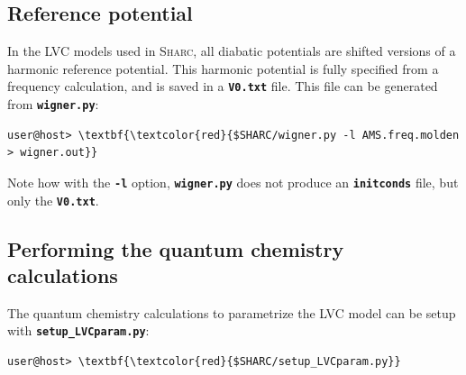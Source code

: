 \documentclass[a4paper,11pt,DIV=15,openany]{scrbook}
\newcommand{\sharc}{\textsc{Sharc}}
\newcommand{\ttt}[1]{\textbf{\texttt{#1}}}
\begin{document}
\subsection{Reference potential}

In the LVC models used in \sharc, all diabatic potentials are shifted versions of a harmonic reference potential.
This harmonic potential is fully specified from a frequency calculation, and is saved in a \ttt{V0.txt} file.
This file can be generated from \ttt{wigner.py}:
\begin{Verbatim}[commandchars=\\\{\}]
user@host> \textbf{\textcolor{red}{$SHARC/wigner.py -l AMS.freq.molden > wigner.out}}
\end{Verbatim}
Note how with the \ttt{-l} option, \ttt{wigner.py} does not produce an \ttt{initconds} file, but only the \ttt{V0.txt}.

\subsection{Performing the quantum chemistry calculations}

The quantum chemistry calculations to parametrize the LVC model can be setup with \ttt{setup\_LVCparam.py}:
\begin{Verbatim}[commandchars=\\\{\}]
user@host> \textbf{\textcolor{red}{$SHARC/setup_LVCparam.py}}
\end{Verbatim}
\end{document}
